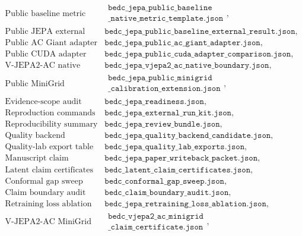 {$$\begin{array}{ll}
\text{Public baseline metric template} &
\begin{array}{l}\texttt{bedc\_jepa\_public\_baseline}\\\texttt{\_native\_metric\_template.json}\end{array},\\
\text{Public JEPA external result} & \texttt{bedc\_jepa\_public\_baseline\_external\_result.json},\\
\text{Public AC Giant adapter} & \texttt{bedc\_jepa\_public\_ac\_giant\_adapter.json},\\
\text{Public CUDA adapter comparison} & \texttt{bedc\_jepa\_public\_cuda\_adapter\_comparison.json},\\
\text{V-JEPA2-AC native boundary} & \texttt{bedc\_jepa\_vjepa2\_ac\_native\_boundary.json},\\
\text{Public MiniGrid calibration extension} &
\begin{array}{l}\texttt{bedc\_jepa\_public\_minigrid}\\\texttt{\_calibration\_extension.json}\end{array},\\
\text{Evidence-scope audit} & \texttt{bedc\_jepa\_readiness.json},\\
\text{Reproduction commands} & \texttt{bedc\_jepa\_external\_run\_kit.json},\\
\text{Reproducibility summary} & \texttt{bedc\_jepa\_review\_bundle.json},\\
\text{Quality backend candidate} & \texttt{bedc\_jepa\_quality\_backend\_candidate.json},\\
\text{Quality-lab export table} & \texttt{bedc\_jepa\_quality\_lab\_exports.json},\\
\text{Manuscript claim summary} & \texttt{bedc\_jepa\_paper\_writeback\_packet.json},\\
\text{Latent claim certificates} & \texttt{bedc\_latent\_claim\_certificates.json},\\
\text{Conformal gap sweep} & \texttt{bedc\_conformal\_gap\_sweep.json},\\
\text{Claim boundary audit} & \texttt{bedc\_claim\_boundary\_audit.json},\\
\text{Retraining loss ablation} & \texttt{bedc\_jepa\_retraining\_loss\_ablation.json},\\
\text{V-JEPA2-AC MiniGrid certificates} &
\begin{array}{l}\texttt{bedc\_vjepa2\_ac\_minigrid}\\\texttt{\_claim\_certificate.json}\end{array},\\

\end{array}$$}
